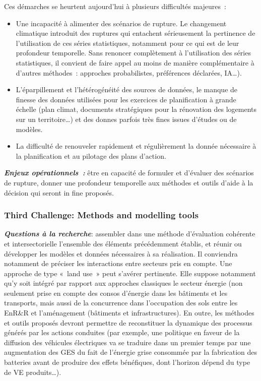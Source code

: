 Ces démarches se heurtent aujourd’hui à plusieurs difficultés majeures : 
\begin{itemize}
    \item Une incapacité à alimenter des scénarios de rupture. Le changement climatique introduit des ruptures qui entachent sérieusement la pertinence de l’utilisation de ces séries statistiques, notamment pour ce qui est de leur profondeur temporelle. Sans renoncer complètement à l’utilisation des séries statistiques, il convient de faire appel au moins de manière complémentaire à d’autres méthodes : approches probabilistes, préférences déclarées, IA…). 
    \item L’éparpillement et l’hétérogénéité des sources de données, le manque de finesse des données utilisées pour les exercices de planification à grande échelle (plan climat, documents stratégiques pour la rénovation des logements sur un territoire…) et des donnes parfois très fines issues d’études ou de modèles.
    \item La difficulté de renouveler rapidement et régulièrement la donnée nécessaire à la planification et au pilotage des plans d’action.
\end{itemize}

\textit{\textbf{Enjeux opérationnels :}} être en capacité de formuler et d’évaluer des scénarios de rupture, donner une profondeur temporelle aux méthodes et outils d’aide à la décision qui seront in fine proposés.  

\subsubsection{Third Challenge: Methods and modelling tools}

\textit{\textbf{Questions à la recherche}}: assembler dans une méthode d’évaluation cohérente et intersectorielle l’ensemble des éléments précédemment établis, et réunir ou développer les modèles et données nécessaires à sa réalisation. Il conviendra notamment de préciser les interactions entre secteurs pris en compte. Une approche de type « land use » peut s’avérer pertinente. Elle suppose notamment qu’y soit intégré par rapport aux approches classiques le secteur énergie (non seulement prise en compte des consos d’énergie dans les bâtiments et les transports, mais aussi de la concurrence dans l’occupation des sols entre les EnR\&R et l’aménagement (bâtiments et infrastructures). En outre, les méthodes et outils proposés devront permettre de reconstituer la dynamique des processus générés par les actions conduites (par exemple, une politique en faveur de la diffusion des véhicules électriques va se traduire dans un premier temps par une augmentation des GES du fait de l’énergie grise consommée par la fabrication des batteries avant de produire des effets bénéfiques, dont l’horizon dépend du type de VE produits…).

